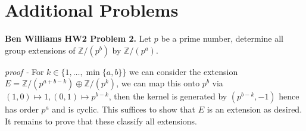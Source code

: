 \documentclass[11pt]{article}
\theoremstyle{definition}
\newcommand{\set}[1]{\{#1\}}
\begin{document}
    \newpage

    \section{Additional Problems}

    \textbf{Ben Williams HW2 Problem 2.} Let \(p\) be a prime number, determine all group extensions of \(\mathbb{Z}/(p^b)\) by \(\mathbb{Z}/(p^a)\).

    \emph{proof - } For \(k \in \set{1,\hdots,\min\set{a,b}}\) we can consider the extension \(E = \mathbb{Z}/(p^{a + b - k}) \oplus \mathbb{Z}/(p^k)\), we can map this onto \(p^b\) via \((1,0) \mapsto 1, (0,1) \mapsto p^{b-k}\), then the kernel is generated by \((p^{b-k},-1)\) hence has order \(p^a\) and is cyclic. This suffices to show that \(E\) is an extension as desired. It remains to prove that these classify all extensions.
    
\end{document}
